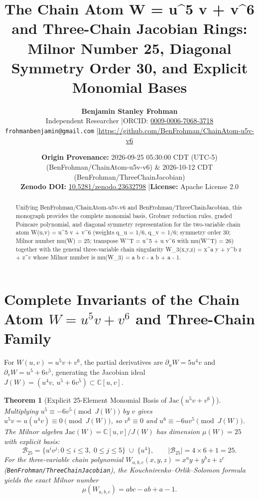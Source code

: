 \documentclass[11pt,letterpaper]{article}
\title{\textbf{The Chain Atom W = u\textasciicircum{}5 v + v\textasciicircum{}6 and Three-Chain Jacobian Rings: Milnor Number 25, Diagonal Symmetry Order 30, and Explicit Monomial Bases}}
\author{\textbf{Benjamin Stanley Frohman}\\
Independent Researcher \quad|\quad ORCID: \href{https://orcid.org/0009-0006-7068-3718}{0009-0006-7068-3718}\\
\texttt{frohmanbenjamin@gmail.com} \quad|\quad \url{https://github.com/BenFrohman/ChainAtom-u5v-v6}}
\date{\textbf{Origin Provenance:} 2026-09-25 05:30:00 CDT (UTC-5) (BenFrohman/ChainAtom-u5v-v6) \& 2026-10-12 CDT (BenFrohman/ThreeChainJacobian)\\
\textbf{Zenodo DOI:} \href{https://doi.org/10.5281/zenodo.23632798}{10.5281/zenodo.23632798} \quad|\quad \textbf{License:} Apache License 2.0}
\newtheorem{theorem}{Theorem}
\begin{document}
\maketitle

\begin{center}
\end{center}

\begin{abstract}
\noindent Unifying BenFrohman/ChainAtom-u5v-v6 and BenFrohman/ThreeChainJacobian, this monograph provides the complete monomial basis, Grobner reduction rules, graded Poincare polynomial, and diagonal symmetry representation for the two-variable chain atom W(u,v) = u\textasciicircum{}5 v + v\textasciicircum{}6 (weights q\_u = 1/6, q\_v = 1/6; symmetry order 30; Milnor number mu(W) = 25; transpose W\textasciicircum{}T = u\textasciicircum{}5 + u v\textasciicircum{}6 with mu(W\textasciicircum{}T) = 26) together with the general three-variable chain singularity W\_3(x,y,z) = x\textasciicircum{}a y + y\textasciicircum{}b z + z\textasciicircum{}c whose Milnor number is mu(W\_3) = a b c - a b + a - 1.
\end{abstract}


\section{Complete Invariants of the Chain Atom $W = u^5 v + v^6$ and Three-Chain Family}
For $W(u,v) = u^5 v + v^6$, the partial derivatives are $\partial_u W = 5 u^4 v$ and $\partial_v W = u^5 + 6 v^5$, generating the Jacobian ideal $J(W) = (u^4 v,\, u^5 + 6 v^5) \subset \mathbb{C}[u,v]$.

\begin{theorem}[Explicit 25-Element Monomial Basis of $\mathrm{Jac}(u^5 v + v^6)$]
Multiplying $u^5 \equiv -6 v^5 \pmod{J(W)}$ by $v$ gives $u^5 v = u(u^4 v) \equiv 0 \pmod{J(W)}$, so $v^6 \equiv 0$ and $u^6 \equiv -6 u v^5 \pmod{J(W)}$. The Milnor algebra $\mathrm{Jac}(W) = \mathbb{C}[u,v]/J(W)$ has dimension $\mu(W) = 25$ with explicit basis:
\begin{equation}
\mathcal{B}_{25} = \bigl\{u^i v^j : 0 \le i \le 3,\; 0 \le j \le 5\bigr\} \;\cup\; \{u^4\}, \qquad |\mathcal{B}_{25}| = 4 \times 6 + 1 = 25.
\end{equation}
For the three-variable chain polynomial $W_{a,b,c}(x,y,z) = x^a y + y^b z + z^c$ (\texttt{BenFrohman/ThreeChainJacobian}), the Kouchnirenko--Orlik--Solomon formula yields the exact Milnor number
\begin{equation}
\mu(W_{a,b,c}) = abc - ab + a - 1.
\end{equation}
\end{theorem}
\end{document}
